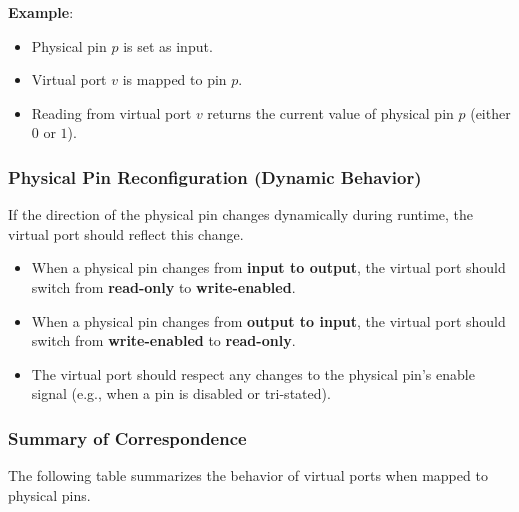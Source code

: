 \textbf{Example}:
\begin{itemize}[noitemsep]
    \item Physical pin $p$ is set as input.
    \item Virtual port $v$ is mapped to pin $p$.
    \item Reading from virtual port $v$ returns the current value of physical pin $p$ (either $0$ or $1$).
\end{itemize}

\subsubsection{Physical Pin Reconfiguration (Dynamic Behavior)}
If the direction of the physical pin changes dynamically during runtime, the virtual port should reflect this change.

\begin{itemize}[noitemsep]
    \item When a physical pin changes from \textbf{input to output}, the virtual port should switch from \textbf{read-only} to \textbf{write-enabled}.
    \item When a physical pin changes from \textbf{output to input}, the virtual port should switch from \textbf{write-enabled} to \textbf{read-only}.
    \item The virtual port should respect any changes to the physical pin's enable signal (e.g., when a pin is disabled or tri-stated).
\end{itemize}

\subsubsection{Summary of Correspondence}
The following table summarizes the behavior of virtual ports when mapped to physical pins.
\renewcommand*{\arraystretch}{1.4}

\begin{table}[ht]
    \centering
    \caption{Virtual Port Behavior Correspondence with Physical Pins}
\end{table}

